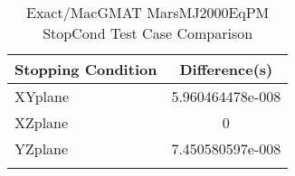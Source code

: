 \begin{table}[htbp!]
\centering
\caption{ Exact/MacGMAT MarsMJ2000EqPM StopCond Test Case Comparison}
      \begin{tabular}{lc}
      \hline\hline
          Stopping Condition & Difference(s) \\
         \hline
         XYplane & 5.960464478e-008 \\
         XZplane & 0 \\
         YZplane & 7.450580597e-008 \\
      \hline\hline
      \label{Table: Exact-MacGMAT MarsMJ2000EqPM StopCond Table} 
\end{tabular}
\end{table}
